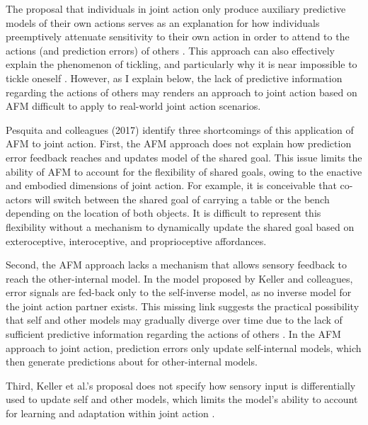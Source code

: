 \begin{CJK}{UTF8}{gbsn}
The proposal that individuals in joint action only produce auxiliary predictive models of their own actions serves as an explanation for how individuals preemptively attenuate sensitivity to their own action in order to attend to the actions (and prediction errors) of others \citep{}.  This approach can also effectively explain the phenomenon of tickling, and particularly why it is near impossible to tickle oneself \citep[due to sensory attenuation resulting from the self-generated predictions about the consequences of action][]{Blakemore2003}.  However, as I explain below, the lack of predictive information regarding the actions of others may renders an approach to joint action based on AFM difficult to apply to real-world joint action scenarios.

Pesquita and colleagues (2017) identify three shortcomings of this application of AFM to joint action.  First, the AFM approach does not explain how prediction error feedback reaches and updates model of the shared goal.  This issue limits the ability of AFM to account for the  flexibility of shared goals, owing to the enactive and embodied dimensions of joint action.  For example, it is conceivable that co-actors will switch between the shared goal of carrying a table or the bench depending on the location of both objects.  It is difficult to represent this flexibility without a mechanism to dynamically update the shared goal based on exteroceptive, interoceptive, and proprioceptive affordances.

Second, the AFM approach lacks a mechanism that allows sensory feedback to reach the other-internal model. In the model proposed by Keller and colleagues, error signals are fed-back only to the self-inverse model, as no inverse model for the joint action partner exists. This missing link suggests the practical possibility that self and other models may gradually diverge over time due to the lack of sufficient predictive information regarding the actions of others \citep{Pickering2014}.  In the AFM approach to joint action, prediction errors only update self-internal models, which then generate predictions about for other-internal models.

Third, Keller et al.’s proposal does not specify how sensory input is differentially used to update self and other models, which limits the model's ability to account for learning and adaptation within joint action \citep{Pesquita2017}.



\end{CJK}
